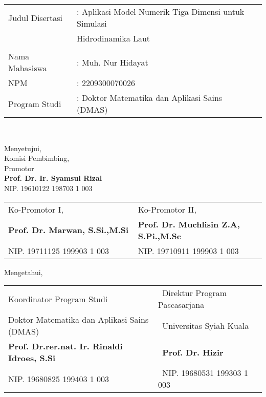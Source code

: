 \setcounter{page}{2}
\vspace{1.5pc}

\begin{center}
	\normalsize
	\noindent
	\begin{tabular}{l l l}
		Judul Disertasi \verb"  " &: Aplikasi Model Numerik Tiga Dimensi untuk Simulasi \\
		& \; Hidrodinamika Laut \\\\
		Nama Mahasiswa &: Muh. Nur Hidayat \\
		NPM &: 2209300070026 \\
		Program Studi	&: Doktor Matematika dan Aplikasi Sains (DMAS)\\ 
	\end{tabular} \\
\end{center}

\begin{center}
	\vspace{1.5cm}
	Menyetujui,\\
	Komisi Pembimbing, \\ \vspace{0.5cm}
	Promotor \\
	\vspace{2cm}
	\textbf{Prof. Dr. Ir. Syamsul Rizal} \\
	NIP. 19610122 198703 1 003
	\vspace{1cm}
	
	\begin{tabular}{l l }
		Ko-Promotor I,\verb"                       " & Ko-Promotor II, \verb"             "\\[2.25cm]
		\textbf{Prof. Dr. Marwan, S.Si.,M.Si} & \textbf{Prof. Dr. Muchlisin Z.A, S.Pi.,M.Sc}\\
		NIP. 19711125 199903 1 003 & NIP. 19710911 199903 1 003
	\end{tabular}
\end{center}

\begin{center}
	\vspace{0.5cm}
	Mengetahui,\\%
	
	\vspace{0.5cm}
	
	\begin{tabular}{l l }
		Koordinator Program Studi\verb"              " & \verb" "Direktur Program Pascasarjana\\
		Doktor Matematika dan Aplikasi Sains (DMAS) & \verb" "Universitas Syiah Kuala\\[2.25cm]
		\textbf{Prof. Dr.rer.nat. Ir. Rinaldi Idroes, S.Si}& \verb" "\textbf{Prof. Dr. Hizir}\\
		NIP. 19680825 199403 1 003 & \verb" "NIP. 19680531 199303 1 003
	\end{tabular}
\end{center}
%	
